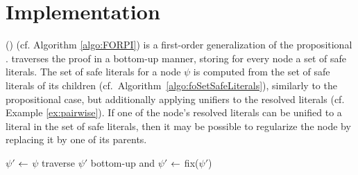 \section{Implementation}
\label{sec:FORPI}
{\FirstOrderRPI} ({\FORPI}) (cf. Algorithm \ref{algo:FORPI}) is a first-order generalization of the propositional {\RPI}.
{\FORPI} traverses the proof in a bottom-up manner, storing for every node a set of safe literals. The set of safe literals for a node $\psi$ is computed from the set of safe literals of its children (cf.\ Algorithm~\ref{algo:foSetSafeLiterals}), similarly to the propositional case, but additionally applying unifiers to the resolved literals (cf. Example \ref{ex:pairwise}).
If one of the node's resolved literals can be unified to a literal in the set of safe literals, then it may be possible to regularize the node by replacing it by one of its parents.  



\IncMargin{0.5em}
\begin{algorithm}[bt]
\begin{footnotesize}


\BlankLine

$\psi'$ $\leftarrow$ $\psi$\;
traverse $\psi'$ bottom-up and 
$\psi'$ $\leftarrow$ fix($\psi'$) \;
\;
\caption{\label{algo:FORPI} \texttt{\FORPI}}
\end{footnotesize}
\end{algorithm}
\DecMargin{0.5em}    



